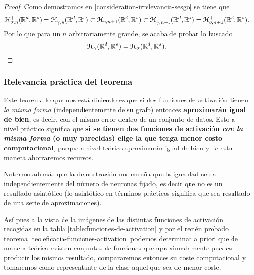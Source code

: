 \begin{aportacionOriginal}
\begin{proof}
    Como demostramos en \ref{consideration-irrelevancia-sesgo} se tiene que 
    \begin{equation*}
        \mathcal{H}^+_{\sigma, n}(\mathbb{R}^d, \mathbb{R}^s) = \mathcal{H}^+_{\gamma, n}(\mathbb{R}^d, \mathbb{R}^s) 
        \subset 
            \mathcal{H}_{\gamma, n+1}(\mathbb{R}^d, \mathbb{R}^s) 
        \subset
        \mathcal{H}^+_{\gamma, {n+1}}(\mathbb{R}^d, \mathbb{R}^s) = \mathcal{H}^+_{\sigma, {n+1}}(\mathbb{R}^d, \mathbb{R}^s) 
        .
    \end{equation*}
    Por lo que para un $n$ arbitrariamente grande, se acaba de probar lo buscado. 
    \begin{equation*}
        \mathcal{H}_{\gamma}(\mathbb{R}^d, \mathbb{R}^s) = \mathcal{H}_{\sigma}(\mathbb{R}^d, \mathbb{R}^s).
    \end{equation*}
\end{proof}
\end{aportacionOriginal}

\subsubsection*{\iconoAclaraciones \textcolor{dark_green}{Relevancia práctica del teorema}}
Este teorema lo que nos está diciendo es que si dos funciones de activación tienen \textit{la misma forma}
(independientemente de su grafo)
entonces \textbf{aproximarán igual de bien},
es decir, con el mismo error dentro de un conjunto de datos.
 Esto a nivel práctico  significa que \textbf{si se tienen dos funciones de activación
  \textit{con la misma forma} (o muy parecidas) elige
   la que tenga menor costo computacional}, porque a 
   nivel teórico aproximarán igual de bien y de esta
    manera ahorraremos recursos. 

Notemos además que la demostración nos enseña que la igualdad se da independientemente del número de 
neuronas fijado, es decir que no es un resultado 
asintótico (lo asintótico en términos prácticos 
significa que sea resultado de una serie de 
aproximaciones).  


Así pues a la vista de la imágenes de las distintas funciones de activación 
recogidas en la tabla \ref{table:funciones-de-activation} y
por el recién probado teorema \ref{teo:eficacia-funciones-activation} podemos determinar a priori 
que de manera teórica existen conjuntos de funciones que aproximadamente  puedes producir los mismos resultado, 
compararemos entonces su coste computacional y tomaremos como representante de la clase aquel que sea de menor coste. 

